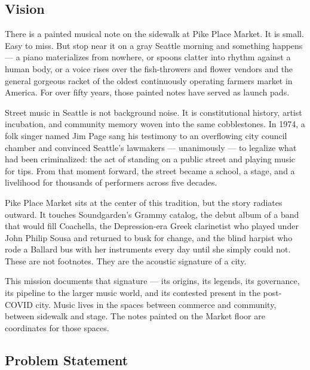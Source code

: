 \documentclass[11pt,letterpaper]{article}
\begin{document}
\subsection{Vision}

There is a painted musical note on the sidewalk at Pike Place Market. It is small. Easy to miss. But stop near it on a gray Seattle morning and something happens --- a piano materializes from nowhere, or spoons clatter into rhythm against a human body, or a voice rises over the fish-throwers and flower vendors and the general gorgeous racket of the oldest continuously operating farmers market in America. For over fifty years, those painted notes have served as launch pads.

Street music in Seattle is not background noise. It is constitutional history, artist incubation, and community memory woven into the same cobblestones. In 1974, a folk singer named Jim Page sang his testimony to an overflowing city council chamber and convinced Seattle's lawmakers --- unanimously --- to legalize what had been criminalized: the act of standing on a public street and playing music for tips. From that moment forward, the street became a school, a stage, and a livelihood for thousands of performers across five decades.

Pike Place Market sits at the center of this tradition, but the story radiates outward. It touches Soundgarden's Grammy catalog, the debut album of a band that would fill Coachella, the Depression-era Greek clarinetist who played under John Philip Sousa and returned to busk for change, and the blind harpist who rode a Ballard bus with her instruments every day until she simply could not. These are not footnotes. They are the acoustic signature of a city.

This mission documents that signature --- its origins, its legends, its governance, its pipeline to the larger music world, and its contested present in the post-COVID city. Music lives in the spaces between commerce and community, between sidewalk and stage. The notes painted on the Market floor are coordinates for those spaces.

\subsection{Problem Statement}
\end{document}
